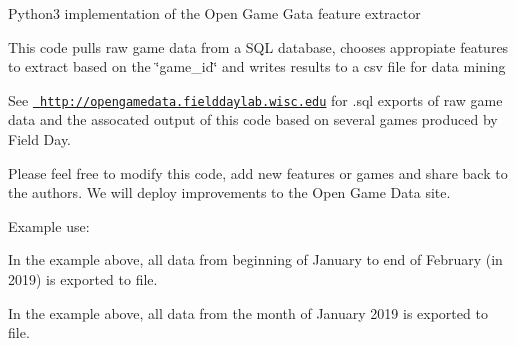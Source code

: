 Python3 implementation of the Open Game Gata feature extractor

This code pulls raw game data from a S\+QL database, chooses appropiate features to extract based on the \char`\"{}game\+\_\+id\char`\"{} and writes results to a csv file for data mining

See \href{http://opengamedata.fielddaylab.wisc.edu}{\texttt{ http\+://opengamedata.\+fielddaylab.\+wisc.\+edu}} for .sql exports of raw game data and the assocated output of this code based on several games produced by Field Day.

Please feel free to modify this code, add new features or games and share back to the authors. We will deploy improvements to the Open Game Data site.


\begin{DoxyCode}{0}
\DoxyCodeLine{}
\end{DoxyCode}


Example use\+: 
\begin{DoxyCode}{0}
\end{DoxyCode}
 In the example above, all data from beginning of January to end of February (in 2019) is exported to file.


\begin{DoxyCode}{0}
\end{DoxyCode}
 In the example above, all data from the month of January 2019 is exported to file. 